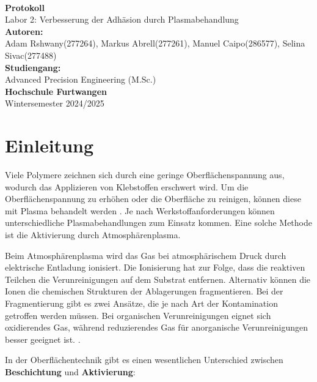 \documentclass[a4paper,12pt]{article}
\begin{document}
\begin{titlepage}
    \centering
    \\[0.5cm]
    {\Huge \textbf{Protokoll}}\\[0.2cm]
    {\LARGE Labor 2: Verbesserung der Adh\"asion durch Plasmabehandlung}\\[1cm]

    \vfill
    \vspace{12cm}
    \textbf{Autoren:}\\
    Adam Rshwany(277264), Markus Abrell(277261), Manuel Caipo(286577), Selina Sivac(277488)\\[0.3cm]

    \textbf{Studiengang:}\\
    Advanced Precision Engineering (M.Sc.)\\[0.3cm]

    \textbf{Hochschule Furtwangen}\\
    Wintersemester 2024/2025\\[0.3cm]

    \vfill
    \date{\today}
\end{titlepage}

\section{Einleitung}

Viele Polymere zeichnen sich durch eine geringe Oberflächenspannung aus, 
wodurch das Applizieren von Klebstoffen erschwert wird. Um die 
Oberflächenspannung zu erhöhen oder die Oberfläche zu reinigen, können 
diese mit Plasma behandelt werden \cite{ref1, ref2}. Je nach 
Werkstoffanforderungen können unterschiedliche Plasmabehandlungen zum 
Einsatz kommen. Eine solche Methode ist die Aktivierung durch 
Atmosphärenplasma.

Beim Atmosphärenplasma wird das Gas bei atmosphärischem Druck durch 
elektrische Entladung ionisiert. Die Ionisierung hat zur Folge, dass 
die reaktiven Teilchen die Verunreinigungen auf dem Substrat entfernen.
 Alternativ können die Ionen die chemischen Strukturen der Ablagerungen 
 fragmentieren. Bei der Fragmentierung gibt es zwei Ansätze, die je nach 
 Art der Kontamination getroffen werden müssen. Bei organischen Verunreinigungen
  eignet sich oxidierendes Gas, während reduzierendes Gas für anorganische
   Verunreinigungen besser geeignet ist. \cite{ref3}.

In der Oberflächentechnik gibt es einen wesentlichen Unterschied 
zwischen \textbf{Beschichtung} und \textbf{Aktivierung}:
\end{document}
